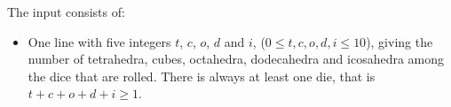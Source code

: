 
  The input consists of:
  \begin{itemize}
    \item One line with five integers $t$, $c$, $o$, $d$ and $i$, ($0 \le t, c,
      o, d, i \le 10$), giving the number of tetrahedra, cubes, octahedra,
      dodecahedra and icosahedra among the dice that are rolled. There is
      always at least one die, that is $t+c+o+d+i \ge 1$.
  \end{itemize}
